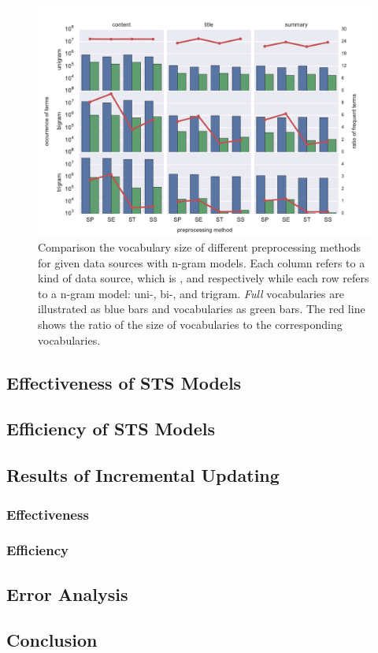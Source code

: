\begin{figure}[!htb]
    \centering
    \includegraphics[width=\textwidth]{fig/vocab_size}
    \caption{Comparison the vocabulary size of different preprocessing methods for given data sources with n-gram models. Each column refers to a kind of data source, which is \icontent{}, \ititle{} and \isummary{} respectively while each row refers to a n-gram model: uni-, bi-, and trigram. \textit{Full} vocabularies are illustrated as blue bars and \icommon{} vocabularies as green bars. The red line shows the ratio of the size of \icommon{} vocabularies to the corresponding \ifull{} vocabularies. }
    \label{fig:vocab_size}
\end{figure}


\subsection{Effectiveness of STS Models}
\label{sec:5.2}

\subsection{Efficiency of STS Models}
\label{sec:5.3}

\subsection{Results of Incremental Updating}
\label{sec:5.4}

\subsubsection{Effectiveness}

\subsubsection{Efficiency}

\subsection{Error Analysis}
\label{sec:5.5}

\subsection{Conclusion}
\label{sec:5.6}
